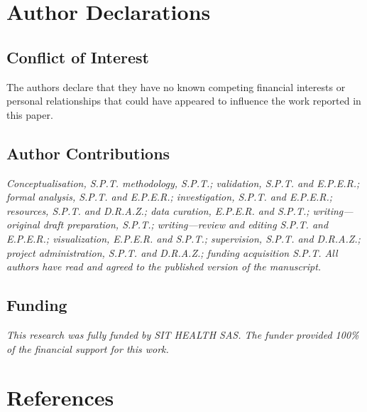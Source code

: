 \documentclass[aip,jcp,reprint,amsmath,amssymb,floatfix]{revtex4-2}
\begin{document}
\section*{Author Declarations}
\subsection*{Conflict of Interest}
The authors declare that they have no known competing financial interests or personal relationships that could have appeared to influence the work reported in this paper.

\subsection*{Author Contributions}
\textit{Conceptualisation, S.P.T. methodology, S.P.T.; validation, S.P.T. and E.P.E.R.; formal analysis, S.P.T. and E.P.E.R.; investigation, S.P.T. and E.P.E.R.; resources, S.P.T. and  D.R.A.Z.; data curation, E.P.E.R. and S.P.T.; writing—original draft preparation, S.P.T.; writing—review and editing S.P.T. and E.P.E.R.; visualization, E.P.E.R. and S.P.T.; supervision, S.P.T. and D.R.A.Z.; project administration, S.P.T. and  D.R.A.Z.; funding acquisition S.P.T. All authors have read and agreed to the published version of the manuscript.}

\subsection*{Funding}
\textit{This research was fully funded by SIT HEALTH SAS. The funder provided 100\% of the financial support for this work.}
\section*{References}
%

\end{document}
